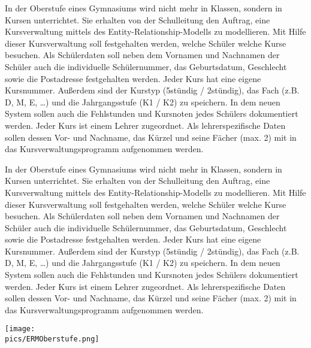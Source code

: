 \begin{Exercise}[title=Erstelle ein ERM., label=ERMErstellen3]
	In der Oberstufe eines Gymnasiums wird nicht mehr in Klassen, sondern in Kursen unterrichtet. Sie erhalten von der Schulleitung den Auftrag, eine Kursverwaltung mittels des Entity-Relationship-Modells zu modellieren. Mit Hilfe dieser Kursverwaltung soll festgehalten werden, welche Schüler welche Kurse besuchen. Als Schülerdaten soll neben dem Vornamen und Nachnamen der Schüler auch die individuelle Schülernummer, das Geburtsdatum, Geschlecht sowie die Postadresse festgehalten	werden. Jeder Kurs hat eine eigene Kursnummer. Außerdem sind der Kurstyp (5stündig / 2stündig), das Fach (z.B. D, M, E, …) und die Jahrgangsstufe (K1 / K2) zu speichern. In dem neuen System sollen auch die Fehlstunden und Kursnoten jedes Schülers dokumentiert werden. Jeder Kurs ist einem Lehrer zugeordnet. Als lehrerspezifische Daten sollen dessen Vor- und Nachname, das Kürzel und seine Fächer (max. 2) mit in das Kursverwaltungsprogramm aufgenommen werden.
\end{Exercise}
\begin{Answer}[ref=ERMErstellen3]
	In der Oberstufe eines Gymnasiums wird nicht mehr in Klassen, sondern in Kursen unterrichtet. Sie erhalten von der Schulleitung den Auftrag, eine Kursverwaltung mittels des Entity-Relationship-Modells zu modellieren. Mit Hilfe dieser Kursverwaltung soll festgehalten werden, welche Schüler welche Kurse besuchen. Als Schülerdaten soll neben dem Vornamen und Nachnamen der Schüler auch die individuelle Schülernummer, das Geburtsdatum, Geschlecht sowie die Postadresse festgehalten werden. Jeder Kurs hat eine eigene Kursnummer. Außerdem sind der Kurstyp (5stündig / 2stündig), das Fach (z.B. D, M, E, …) und die Jahrgangsstufe (K1 / K2) zu speichern. In dem neuen System sollen auch die Fehlstunden und Kursnoten jedes Schülers dokumentiert werden. Jeder Kurs ist einem Lehrer zugeordnet. Als lehrerspezifische Daten sollen dessen Vor- und Nachname, das Kürzel und seine Fächer (max. 2) mit in das Kursverwaltungsprogramm aufgenommen werden.

	\begin{minipage}{\textwidth}
		\centering\texttt{[image: \\pics/ERMOberstufe.png]}
	\end{minipage}
\end{Answer}
